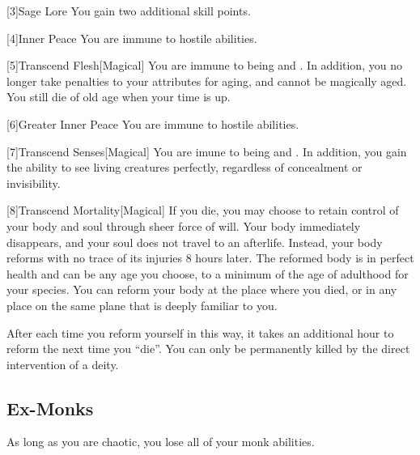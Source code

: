         [3]{Sage Lore} You gain two additional skill points.

        [4]{Inner Peace} You are immune to hostile  abilities.

        [5]{Transcend Flesh}[Magical]
        You are immune to being  and .
        In addition, you no longer take penalties to your attributes for aging, and cannot be magically aged.
        You still die of old age when your time is up.

        [6]{Greater Inner Peace}
        You are immune to hostile  abilities.

        [7]{Transcend Senses}[Magical]
        You are imune to being  and .
        In addition, you gain the ability to see living creatures perfectly, regardless of concealment or invisibility.

        [8]{Transcend Mortality}[Magical]
        If you die, you may choose to retain control of your body and soul through sheer force of will.
        Your body immediately disappears, and your soul does not travel to an afterlife.
        Instead, your body reforms with no trace of its injuries 8 hours later.
        The reformed body is in perfect health and can be any age you choose, to a minimum of the age of adulthood for your species.
        You can reform your body at the place where you died, or in any place on the same plane that is deeply familiar to you.

        After each time you reform yourself in this way, it takes an additional hour to reform the next time you ``die''.
        You can only be permanently killed by the direct intervention of a deity.

    \subsection{Ex-Monks}
        As long as you are chaotic, you lose all of your  monk abilities.

\newpage
